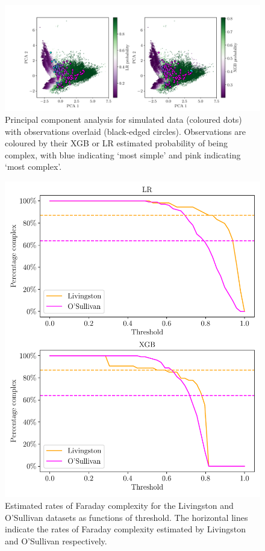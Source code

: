     \begin{figure}
      \centering
      \includegraphics[width=\linewidth]{faraday-images/pca_with_overlay.pdf}
      \caption[Principal component analysis for simulated data with observations overlaid.]{Principal component analysis for simulated data (coloured dots) with observations overlaid (black-edged circles). Observations are coloured by their XGB or LR estimated probability of being complex, with blue indicating `most simple' and pink indicating `most complex'.}
      \label{fig:faraday-pca}
    \end{figure}
    \begin{figure}
      \centering
      \includegraphics[width=\linewidth]{faraday-images/pc_complex_curves.pdf}
      \caption[Estimated rates of Faraday complexity for the Livingston and O'Sullivan datasets as functions of threshold.]{Estimated rates of Faraday complexity for the Livingston and O'Sullivan datasets as functions of threshold. The horizontal lines indicate the rates of Faraday complexity estimated by Livingston and O'Sullivan respectively.}
      \label{fig:faraday-complexity-rates}
    \end{figure}

